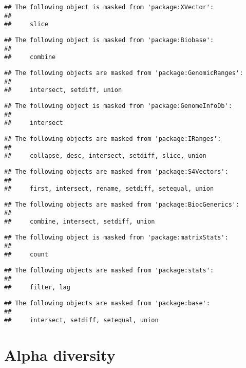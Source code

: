 \documentclass[
  oneside]{book}
\begin{document}
\begin{verbatim}
## The following object is masked from 'package:XVector':
## 
##     slice
\end{verbatim}

\begin{verbatim}
## The following object is masked from 'package:Biobase':
## 
##     combine
\end{verbatim}

\begin{verbatim}
## The following objects are masked from 'package:GenomicRanges':
## 
##     intersect, setdiff, union
\end{verbatim}

\begin{verbatim}
## The following object is masked from 'package:GenomeInfoDb':
## 
##     intersect
\end{verbatim}

\begin{verbatim}
## The following objects are masked from 'package:IRanges':
## 
##     collapse, desc, intersect, setdiff, slice, union
\end{verbatim}

\begin{verbatim}
## The following objects are masked from 'package:S4Vectors':
## 
##     first, intersect, rename, setdiff, setequal, union
\end{verbatim}

\begin{verbatim}
## The following objects are masked from 'package:BiocGenerics':
## 
##     combine, intersect, setdiff, union
\end{verbatim}

\begin{verbatim}
## The following object is masked from 'package:matrixStats':
## 
##     count
\end{verbatim}

\begin{verbatim}
## The following objects are masked from 'package:stats':
## 
##     filter, lag
\end{verbatim}

\begin{verbatim}
## The following objects are masked from 'package:base':
## 
##     intersect, setdiff, setequal, union
\end{verbatim}

\hypertarget{alpha-diversity}{%
\chapter{Alpha diversity}\label{alpha-diversity}}
\end{document}
